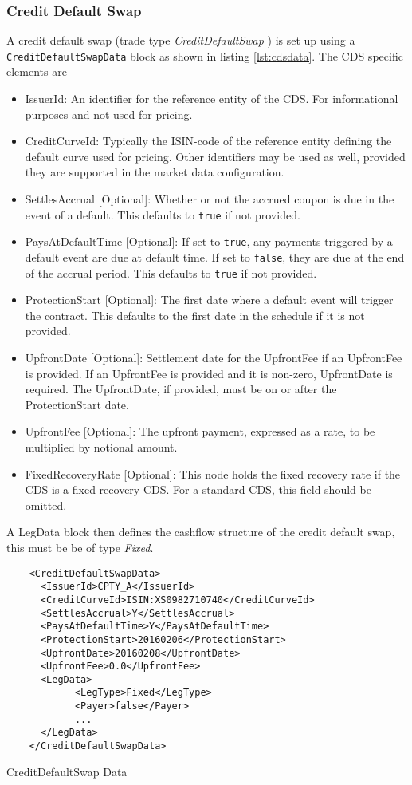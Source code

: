 \subsubsection{Credit Default Swap}

A credit default swap (trade type \emph{CreditDefaultSwap} ) is set up using a {\tt CreditDefaultSwapData} block as shown in listing \ref{lst:cdsdata}. The CDS specific elements
are

\begin{itemize}
\item IssuerId: An identifier for the reference entity of the CDS. For informational purposes and not used for pricing.
\item CreditCurveId: Typically the ISIN-code of the reference entity defining the default curve used for pricing. Other identifiers may be used as well, provided they are supported in the market data configuration.
\item SettlesAccrual [Optional]: Whether or not the accrued coupon is due in the event of a default. This defaults to \lstinline!true! if not provided.
\item PaysAtDefaultTime [Optional]: If set to \lstinline!true!, any payments triggered by a default event are due at default time. If set to \lstinline!false!, they are due at the end of the accrual period. This defaults to \lstinline!true! if not provided.
\item ProtectionStart [Optional]: The first date where a default event will trigger the contract. This defaults to the first date in the schedule if it is not provided.
\item UpfrontDate [Optional]: Settlement date for the UpfrontFee if an UpfrontFee is provided. If an UpfrontFee is provided and it is non-zero, UpfrontDate is required. The UpfrontDate, if provided, must be on or after the ProtectionStart date.
\item UpfrontFee [Optional]: The upfront payment, expressed as a rate, to be multiplied by notional amount.
\item FixedRecoveryRate [Optional]: This node holds the fixed recovery rate if the CDS is a fixed recovery CDS. For a standard CDS, this field should be omitted.
\end{itemize}

A LegData block then defines the cashflow structure of the credit default swap, this must be be of type \emph{Fixed}.

\begin{listing}[H]
\begin{verbatim}
    <CreditDefaultSwapData>
      <IssuerId>CPTY_A</IssuerId>
      <CreditCurveId>ISIN:XS0982710740</CreditCurveId>
      <SettlesAccrual>Y</SettlesAccrual>
      <PaysAtDefaultTime>Y</PaysAtDefaultTime>
      <ProtectionStart>20160206</ProtectionStart>
      <UpfrontDate>20160208</UpfrontDate>
      <UpfrontFee>0.0</UpfrontFee>
      <LegData>
            <LegType>Fixed</LegType>
            <Payer>false</Payer>
            ...
      </LegData>
    </CreditDefaultSwapData>
\end{verbatim}
\caption{CreditDefaultSwap Data}
\label{lst:cdsdata}
\end{listing}